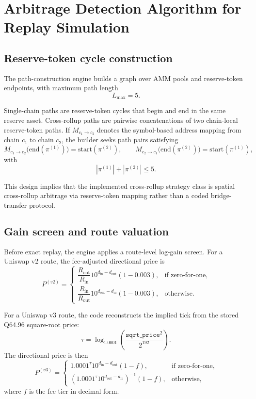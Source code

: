 \documentclass[11pt]{article}
\begin{document}
\section{Arbitrage Detection Algorithm for Replay Simulation}

\subsection{Reserve-token cycle construction}

The path-construction engine builds a graph over AMM pools and reserve-token endpoints, with maximum path length
\[
L_{\max}=5.
\]

Single-chain paths are reserve-token cycles that begin and end in the same reserve asset. Cross-rollup paths are pairwise concatenations of two chain-local reserve-token paths. If \(M_{c_1\rightarrow c_2}\) denotes the symbol-based address mapping from chain \(c_1\) to chain \(c_2\), the builder seeks path pairs satisfying
\[
M_{c_1\rightarrow c_2}\big(\mathrm{end}(\pi^{(1)})\big)=\mathrm{start}(\pi^{(2)}),
\qquad
M_{c_2\rightarrow c_1}\big(\mathrm{end}(\pi^{(2)})\big)=\mathrm{start}(\pi^{(1)}),
\]
with
\[
|\pi^{(1)}|+|\pi^{(2)}|\le 5.
\]

This design implies that the implemented cross-rollup strategy class is spatial cross-rollup arbitrage via reserve-token mapping rather than a coded bridge-transfer protocol.

\subsection{Gain screen and route valuation}

Before exact replay, the engine applies a route-level log-gain screen. For a Uniswap v2 route, the fee-adjusted directional price is
\[
P^{(v2)}=
\begin{cases}
\dfrac{R_{\mathrm{out}}}{R_{\mathrm{in}}}10^{d_{\mathrm{in}}-d_{\mathrm{out}}}(1-0.003), & \text{if zero-for-one},\\[1em]
\dfrac{R_{\mathrm{in}}}{R_{\mathrm{out}}}10^{d_{\mathrm{out}}-d_{\mathrm{in}}}(1-0.003), & \text{otherwise.}
\end{cases}
\]

For a Uniswap v3 route, the code reconstructs the implied tick from the stored Q64.96 square-root price:
\[
\tau = \log_{1.0001}\!\left(\frac{\texttt{sqrt\_price}^2}{2^{192}}\right).
\]
The directional price is then
\[
P^{(v3)}=
\begin{cases}
1.0001^{\tau}10^{d_{\mathrm{in}}-d_{\mathrm{out}}}(1-f), & \text{if zero-for-one},\\[0.6em]
\left(1.0001^{\tau}10^{d_{\mathrm{out}}-d_{\mathrm{in}}}\right)^{-1}(1-f), & \text{otherwise,}
\end{cases}
\]
where \(f\) is the fee tier in decimal form.
\end{document}
